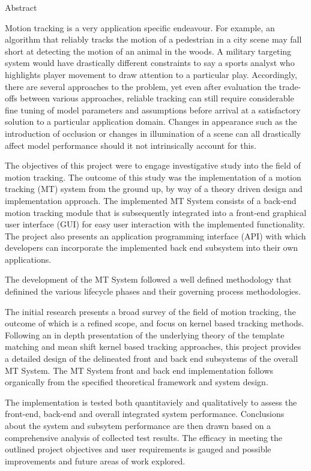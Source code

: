 \begin{centerpage}{Abstract}
 
Motion tracking is a very application specific endeavour. For example, an
    algorithm that reliably tracks the motion of a pedestrian in a city scene may fall
    short at detecting the motion of an animal in the woods. A military targeting
    system would have drastically different constraints to say a sports analyst
    who highlights player movement to draw attention to a particular play.
    Accordingly, there are several approaches to the problem, yet even after evaluation
    the trade-offs between various approaches, reliable tracking can still require
    considerable fine tuning of model parameters and assumptions before arrival at a
    satisfactory solution to a particular application domain. 
    Changes in appearance such as the introduction of occlusion or changes in
    illumination of a scene can all drastically affect model performance should it
    not intrinsically account for this.

The objectives of this project were to engage investigative study into the field
    of motion tracking. The outcome of this study was the implementation of a
    motion tracking (MT) system from the ground up, by way of a theory driven design
    and implementation approach. The implemented MT System consists of a
    back-end motion tracking module that is subsequently integrated into a
    front-end graphical user interface (GUI) for easy user interaction with the
    implemented functionality.
    The project also presents an application programming interface (API) with
    which developers can incorporate the implemented back end subsystem into
    their own applications.

The development of the MT System followed a well defined methodology that
    definined the various lifecycle phases and their governing process
    methodologies. 
    
The initial research presents a broad survey of the field of motion tracking,
    the outcome of which is a refined scope, and focus on kernel based tracking
    methods. Following an in depth presentation of the underlying theory
    of the template matching and mean shift kernel based tracking approaches,
    this project provides a detailed design of the delineated front and back end
    subsystems of the overall MT System. The MT System front and back end
    implementation follows organically from the specified theoretical framework
    and system design. 
    
The implementation is tested both quantitaviely and qualitatively to assess the
    front-end, back-end and overall integrated system performance. 
    Conclusions about the system and subsytem performance are then drawn based on a
    comprehensive analysis of collected test results. The efficacy in meeting the
    outlined project objectives and user requirements is gauged and possible
    improvements and future areas of work explored.




\end{centerpage}
